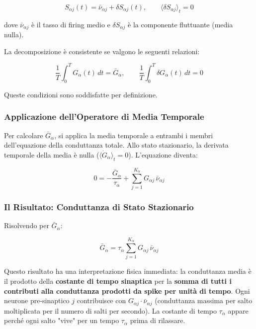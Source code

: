 \begin{equation}
S_{\alpha j}(t) = \bar{\nu}_{\alpha j} + \delta S_{\alpha j}(t), \qquad \langle \delta S_{\alpha j} \rangle_t = 0
\end{equation}

dove $\bar{\nu}_{\alpha j}$ è il tasso di firing medio e $\delta S_{\alpha j}$ è la componente fluttuante (media nulla).

La decomposizione è consistente se valgono le seguenti relazioni:

\begin{equation}
\frac{1}{T}\int_0^T G_\alpha(t)\, dt = \bar{G}_\alpha, \qquad \frac{1}{T}\int_0^T \delta G_\alpha(t)\, dt = 0
\end{equation}

Queste condizioni sono soddisfatte per definizione.


\subsubsection{Applicazione dell'Operatore di Media Temporale}

Per calcolare $\bar{G}_\alpha$, si applica la media temporale a entrambi i membri dell'equazione della conduttanza totale. Allo stato stazionario, la derivata temporale della media è nulla ($\langle \dot{G}_\alpha \rangle_t = 0$). L'equazione diventa:

\begin{equation}
0 = -\frac{\bar{G}_\alpha}{\tau_\alpha} + \sum_{j=1}^{K_\alpha} G_{\alpha j}\,\bar{\nu}_{\alpha j}
\end{equation}

\subsubsection{Il Risultato: Conduttanza di Stato Stazionario}

Risolvendo per $\bar{G}_\alpha$:

\begin{equation}
\boxed{\bar{G}_\alpha = \tau_\alpha \sum_{j=1}^{K_\alpha} G_{\alpha j}\,\bar{\nu}_{\alpha j}}
\end{equation}

Questo risultato ha una interpretazione fisica immediata: la conduttanza media è il prodotto della \textbf{costante di tempo sinaptica} per la \textbf{somma di tutti i contributi alla conduttanza prodotti da spike per unità di tempo}. Ogni neurone pre-sinaptico $j$ contribuisce con $G_{\alpha j} \cdot \bar{\nu}_{\alpha j}$ (conduttanza massima per salto moltiplicata per il numero di salti per secondo). La costante di tempo $\tau_\alpha$ appare perché ogni salto "vive" per un tempo $\tau_\alpha$ prima di rilassare.

